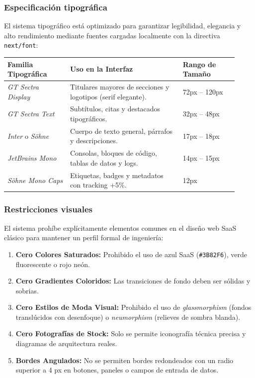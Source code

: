 \documentclass[11pt,letterpaper]{article}
\begin{document}
\subsubsection{Especificación tipográfica}
El sistema tipográfico está optimizado para garantizar legibilidad, elegancia y alto rendimiento mediante fuentes cargadas localmente con la directiva \texttt{next/font}:
\begin{longtable}{p{0.25\linewidth}p{0.45\linewidth}p{0.22\linewidth}}
\toprule
\textbf{Familia Tipográfica} & \textbf{Uso en la Interfaz} & \textbf{Rango de Tamaño} \\
\midrule
\emph{GT Sectra Display} & Titulares mayores de secciones y logotipos (serif elegante). & 72px -- 120px \\
\emph{GT Sectra Text} & Subtítulos, citas y destacados tipográficos. & 32px -- 48px \\
\emph{Inter} o \emph{Söhne} & Cuerpo de texto general, párrafos y descripciones. & 17px -- 18px \\
\emph{JetBrains Mono} & Consolas, bloques de código, tablas de datos y logs. & 14px -- 15px \\
\emph{Söhne Mono Caps} & Etiquetas, badges y metadatos con tracking +5\%. & 12px \\
\bottomrule
\end{longtable}

\subsubsection{Restricciones visuales}
El sistema prohíbe explícitamente elementos comunes en el diseño web SaaS clásico para mantener un perfil formal de ingeniería:
\begin{enumerate}
\item \textbf{Cero Colores Saturados:} Prohibido el uso de azul SaaS (\texttt{\#3B82F6}), verde fluorescente o rojo neón.
\item \textbf{Cero Gradientes Coloridos:} Las transiciones de fondo deben ser sólidas y sobrias.
\item \textbf{Cero Estilos de Moda Visual:} Prohibido el uso de \emph{glassmorphism} (fondos translúcidos con desenfoque) o \emph{neumorphism} (relieves de sombra blanda).
\item \textbf{Cero Fotografías de Stock:} Solo se permite iconografía técnica precisa y diagramas de arquitectura reales.
\item \textbf{Bordes Angulados:} No se permiten bordes redondeados con un radio superior a 4 px en botones, paneles o campos de entrada de datos.
\end{enumerate}
\end{document}
